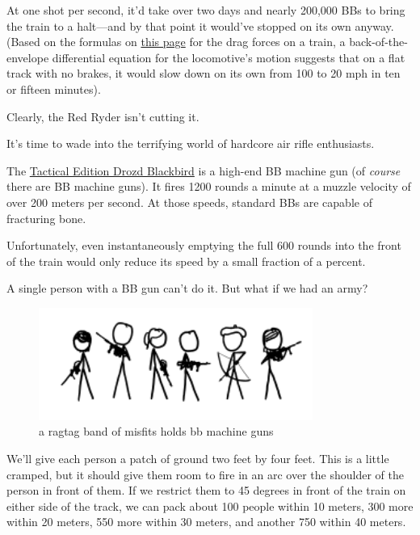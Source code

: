 {At one shot per second, it’d take over two days and nearly 200,000 BBs to bring the train to a halt—and by that point it would’ve stopped on its own anyway. (Based on the formulas on \href{https://pantherfile.uwm.edu/horowitz/www/PropulsionResistance.html}{this page} for the drag forces on a train, a back-of-the-envelope differential equation for the locomotive's motion suggests that on a flat track with no brakes, it would slow down on its own from 100 to 20 mph in ten or fifteen minutes).}

{Clearly, the Red Ryder isn’t cutting it.}

{It’s time to wade into the terrifying world of hardcore air rifle enthusiasts.}

{The \href{http://www.drozdmax.com/bb-machine-guns/tactical-edition-blackbird.html}{Tactical Edition Drozd Blackbird} is a high-end BB machine gun (of \emph{course} there are BB machine guns). It fires 1200 rounds a minute at a muzzle velocity of over 200 meters per second. At those speeds, standard BBs are capable of fracturing bone.}

{Unfortunately, even instantaneously emptying the full 600 rounds into the front of the train would only reduce its speed by a small fraction of a percent.}

{A single person with a BB gun can't do it. But what if we had an army?}

\begin{figure}[!htbp]
\centering
\includegraphics[scale=0.5, max width=0.8\textwidth]{imgs/a/18/bb_army.png}
\caption{a ragtag band of misfits holds bb machine guns}
\end{figure}

{We’ll give each person a patch of ground two feet by four feet. This is a little cramped, but it should give them room to fire in an arc over the shoulder of the person in front of them. If we restrict them to 45 degrees in front of the train on either side of the track, we can pack about 100 people within 10 meters, 300 more within 20 meters, 550 more within 30 meters, and another 750 within 40 meters.}

